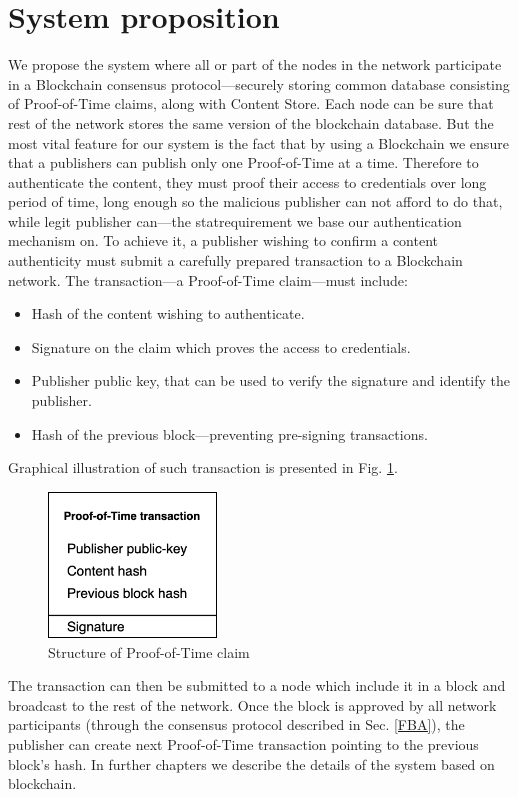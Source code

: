 \section{System proposition}
We propose the system where all or part of the nodes in the network participate in a Blockchain consensus protocol––securely storing common database consisting of Proof-of-Time claims, along with Content Store. Each node can be sure that rest of the network stores the same version of the blockchain database. But the most vital feature for our system is the fact that by using a Blockchain we ensure that a publishers can publish only one Proof-of-Time at a time. Therefore  to authenticate the content, they must proof their access to credentials over long period of time, long enough so the malicious publisher can not afford to do that, while legit publisher can––the statrequirement we base our authentication mechanism on. To achieve it, a publisher wishing to confirm a content authenticity must submit a carefully prepared transaction to a Blockchain network. The transaction––a Proof-of-Time claim––must include:
\begin{itemize}
    \item Hash of the content wishing to authenticate.
    \item Signature on the claim which proves the access to credentials.
    \item Publisher public key, that can be used to verify the signature and identify the publisher.
    \item Hash of the previous block––preventing pre-signing transactions.
\end{itemize}
Graphical illustration of such transaction is presented in Fig. \ref{fig:proof-of-time}.
\begin{figure}[h!]
    \centering
    \includegraphics[width=0.4\textwidth]{img/proof-of-time_transaction.png}
    \caption{Structure of Proof-of-Time claim}
    \label{fig:proof-of-time}
\end{figure}

The transaction can then be submitted to a node which include it in a block and broadcast to the rest of the network. Once the block is approved by all network participants (through the consensus protocol described in Sec. \ref{FBA}), the publisher can create next Proof-of-Time transaction pointing to the previous block's hash.    In further chapters we describe the details of the system based on blockchain.

